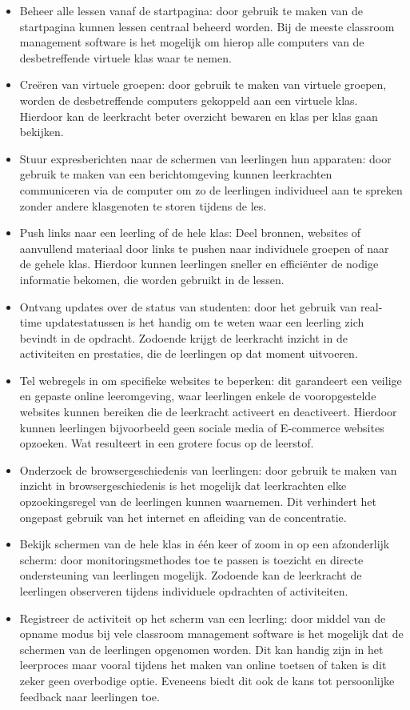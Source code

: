 \begin{itemize}
    \item Beheer alle lessen vanaf de startpagina: door gebruik te maken van de startpagina kunnen lessen centraal beheerd worden. Bij de meeste classroom management software is het mogelijk om hierop alle computers van de desbetreffende virtuele klas waar te nemen.
    \item Creëren van virtuele groepen: door gebruik te maken van virtuele groepen, worden de desbetreffende computers gekoppeld aan een virtuele klas. Hierdoor kan de leerkracht beter overzicht bewaren en klas per klas gaan bekijken.
    \item Stuur expresberichten naar de schermen van leerlingen hun apparaten: door gebruik te maken van een berichtomgeving kunnen leerkrachten communiceren via de computer om zo de leerlingen individueel aan te spreken zonder andere klasgenoten te storen tijdens de les.
    \item Push links naar een leerling of de hele klas: Deel bronnen, websites of aanvullend materiaal door links te pushen naar individuele groepen of naar de gehele klas. Hierdoor kunnen leerlingen sneller en efficiënter de nodige informatie bekomen, die worden gebruikt in de lessen.
    \item Ontvang updates over de status van studenten: door het gebruik van real-time updatestatussen is het handig om te weten waar een leerling zich bevindt in de opdracht. Zodoende krijgt de leerkracht inzicht in de activiteiten en prestaties, die de leerlingen op dat moment uitvoeren.
    \item Tel webregels in om specifieke websites te beperken: dit garandeert een veilige en gepaste online leeromgeving, waar leerlingen enkele de vooropgestelde websites kunnen bereiken die de leerkracht activeert en deactiveert. Hierdoor kunnen leerlingen bijvoorbeeld geen sociale media of E-commerce websites opzoeken. Wat resulteert in een grotere focus op de leerstof.
    \item Onderzoek de browsergeschiedenis van leerlingen: door gebruik te maken van inzicht in browsergeschiedenis is het mogelijk dat leerkrachten elke opzoekingsregel van de leerlingen kunnen waarnemen. Dit verhindert het ongepast gebruik van het internet en afleiding van de concentratie. 
    \item Bekijk schermen van de hele klas in één keer of zoom in op een afzonderlijk scherm: door monitoringsmethodes toe te passen is toezicht en directe ondersteuning van leerlingen mogelijk. Zodoende kan de leerkracht de leerlingen observeren tijdens individuele opdrachten of activiteiten.
    \item Registreer de activiteit op het scherm van een leerling: door middel van de opname modus bij vele classroom management software is het mogelijk dat de schermen van de leerlingen opgenomen worden. Dit kan handig zijn in het leerproces maar vooral tijdens het maken van online toetsen of taken is dit zeker geen overbodige optie. Eveneens biedt dit ook de kans tot persoonlijke feedback naar leerlingen toe.
\end{itemize}
